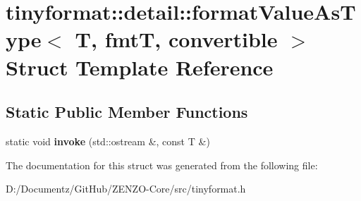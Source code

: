 \hypertarget{structtinyformat_1_1detail_1_1format_value_as_type}{}\section{tinyformat\+::detail\+::format\+Value\+As\+Type$<$ T, fmtT, convertible $>$ Struct Template Reference}
\label{structtinyformat_1_1detail_1_1format_value_as_type}
\subsection*{Static Public Member Functions}
\begin{DoxyCompactItemize}
\item 
\mbox{\label{structtinyformat_1_1detail_1_1format_value_as_type_a126bc5958024c456851f08fa380d1cac}} 
static void {\bfseries invoke} (std\+::ostream \&, const T \&)
\end{DoxyCompactItemize}


The documentation for this struct was generated from the following file\+:\begin{DoxyCompactItemize}
\item 
D\+:/\+Documentz/\+Git\+Hub/\+Z\+E\+N\+Z\+O-\/\+Core/src/tinyformat.\+h\end{DoxyCompactItemize}
